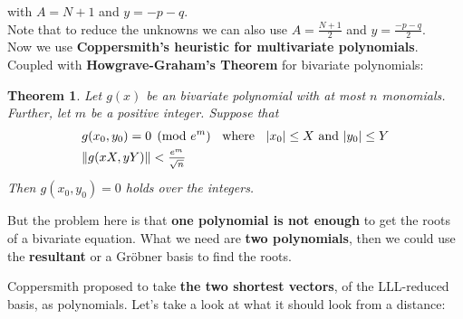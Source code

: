 \documentclass[a4paper,11pt]{article}
\newtheorem{theorem}{Theorem}
\begin{document}
with $A = N + 1$ and $y = -p -q$.\\
Note that to reduce the unknowns we can also use $A = \frac{N + 1}{2}$ and $y = \frac{-p-q}{2}$.\\

Now we use \textbf{Coppersmith's heuristic for multivariate polynomials}. Coupled with \textbf{Howgrave-Graham's Theorem} for bivariate polynomials:

\begin{theorem}
Let $g(x)$ be an bivariate polynomial with at most $n$ monomials. Further, let $m$ be a positive integer. Suppose that
\setcounter{equation}{0}
\begin{align}
&g(x_0,y_0) = 0 \pmod{e^m} \hspace{2mm} \text{ where } \hspace{2mm} |x_0| \leq X \text{ and } |y_0| \leq Y\\
&\|g(xX,yY)\| < \frac{_{e^m}}{^{\sqrt{n}}}
\end{align}
Then $g(x_0,y_0)=0$ holds over the integers.\\
\end{theorem}

But the problem here is that \textbf{one polynomial is not enough} to get the roots of a bivariate equation. What we need are \textbf{two polynomials}, then we could use the \textbf{resultant} or a Gröbner basis to find the roots.

Coppersmith proposed to take \textbf{the two shortest vectors}, of the LLL-reduced basis, as polynomials. Let's take a look at what it should look from a distance:\\
\end{document}
